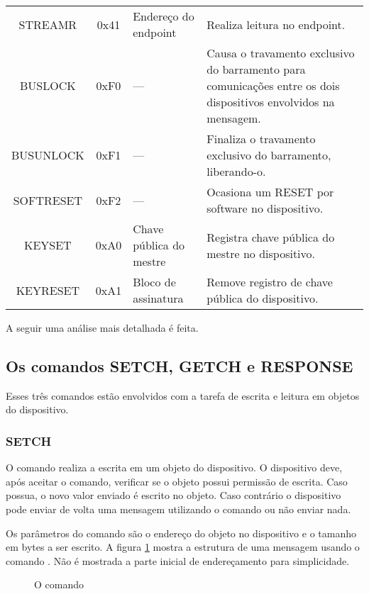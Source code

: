 \documentclass[11pt]{report}
\begin{document}
\begin{table}[H]
\begin{tabular}{c c p{4cm} p{6cm}}
STREAMR	&	0x41			&	Endereço do endpoint		&	Realiza leitura no endpoint.\\
BUSLOCK	&	0xF0			&	---						& 	Causa o travamento exclusivo do barramento para comunicações entre os dois dispositivos envolvidos na mensagem.\\
BUSUNLOCK&	0xF1			&	---						&	Finaliza o travamento exclusivo do barramento, liberando-o.\\
SOFTRESET&	0xF2			&	---						&	Ocasiona um RESET por software no dispositivo.\\
KEYSET	&	0xA0			&	Chave pública do mestre	&	Registra chave pública do mestre no dispositivo.\\
KEYRESET	&	0xA1			&	Bloco de assinatura		&	Remove registro de chave pública do dispositivo.\\
\hline
\end{tabular}
\end{table}

A seguir uma análise mais detalhada é feita.

\subsection{Os comandos SETCH, GETCH e RESPONSE}

Esses três comandos estão envolvidos com a tarefa de escrita e leitura em objetos do dispositivo.

\subsubsection{SETCH}

O comando  realiza a escrita em um objeto do dispositivo. O dispositivo deve, após aceitar o comando, verificar se o objeto possui permissão de escrita. Caso possua, o novo valor enviado é escrito no objeto. Caso contrário o dispositivo pode enviar de volta uma mensagem utilizando o comando  ou não enviar nada.

Os parâmetros do comando  são o endereço do objeto no dispositivo e o tamanho em bytes a ser escrito. A figura \ref{fig:setch} mostra a estrutura de uma mensagem usando o comando . Não é mostrada a parte inicial de endereçamento para simplicidade.

\begin{figure}[H]
\centering

\caption{O comando }
\label{fig:setch}
\end{figure}
\end{document}
